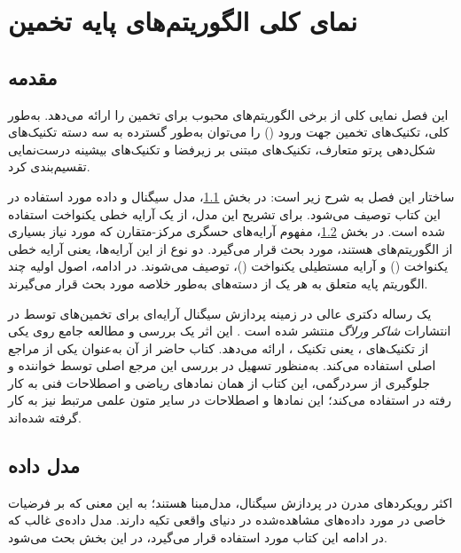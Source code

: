 
\chapter{نمای کلی الگوریتم‌های پایه تخمین }
\label{chap:3}

\section{مقدمه}
\label{sec:3-1}

این فصل نمایی کلی از برخی الگوریتم‌های محبوب برای تخمین  را ارائه می‌دهد. به‌طور کلی، تکنیک‌های تخمین جهت ورود () را می‌توان به‌طور گسترده به سه دسته تکنیک‌های شکل‌دهی پرتو متعارف، تکنیک‌های مبتنی بر زیرفضا و تکنیک‌های بیشینه درست‌نمایی تقسیم‌بندی کرد.

ساختار این فصل به شرح زیر است: در بخش \ref{sec:3-1}، مدل سیگنال و داده مورد استفاده در این کتاب توصیف می‌شود. برای تشریح این مدل، از یک آرایه خطی یکنواخت استفاده شده است. در بخش \ref{sec:3-2}، مفهوم آرایه‌های حسگری مرکز-متقارن که مورد نیاز بسیاری از الگوریتم‌های  هستند، مورد بحث قرار می‌گیرد. دو نوع از این آرایه‌ها، یعنی آرایه خطی یکنواخت () و آرایه مستطیلی یکنواخت ()، توصیف می‌شوند. در ادامه، اصول اولیه چند الگوریتم پایه متعلق به هر یک از دسته‌های  به‌طور خلاصه مورد بحث قرار می‌گیرند.

یک رساله دکتری عالی در زمینه پردازش سیگنال آرایه‌ای برای تخمین‌های  توسط  در انتشارات \textit{شاکر ورلاگ} منتشر شده است \cite{1}. این اثر یک بررسی و مطالعه جامع روی یکی از تکنیک‌های ، یعنی تکنیک ، ارائه می‌دهد. کتاب حاضر از آن به‌عنوان یکی از مراجع اصلی استفاده می‌کند. به‌منظور تسهیل در بررسی این مرجع اصلی توسط خواننده و جلوگیری از سردرگمی، این کتاب از همان نمادهای ریاضی و اصطلاحات فنی به کار رفته در \cite{1} استفاده می‌کند؛ این نمادها و اصطلاحات در سایر متون علمی مرتبط نیز به کار گرفته شده‌اند.


\section{مدل داده}
\label{sec:3-2}

اکثر رویکردهای مدرن در پردازش سیگنال، مدل‌مبنا هستند؛ به این معنی که بر فرضیات خاصی در مورد داده‌های مشاهده‌شده در دنیای واقعی تکیه دارند. مدل داده‌ی غالب که در ادامه این کتاب مورد استفاده قرار می‌گیرد، در این بخش بحث می‌شود.

